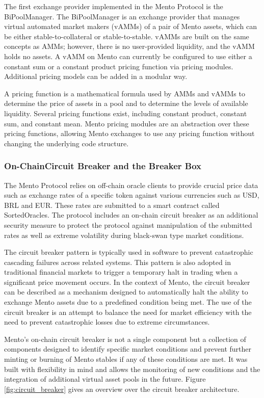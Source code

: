 \documentclass[a4paper]{article}
\theoremstyle{definition}
\begin{document}
The first exchange provider implemented in the Mento Protocol is the BiPoolManager. The BiPoolManager is an exchange provider that manages virtual automated market makers (vAMMs) of a pair of Mento assets, which can be either stable-to-collateral or stable-to-stable. vAMMs are built on the same concepts as AMMs; however, there is no user-provided liquidity, and the vAMM holds no assets. A vAMM on Mento can currently be configured to use either a constant sum or a constant product pricing function via pricing modules. Additional pricing models can be added in a modular way.  

A pricing function is a mathematical formula used by AMMs and vAMMs to determine the price of assets in a pool and to determine the levels of available liquidity. Several pricing functions exist, including constant product, constant sum, and constant mean. Mento pricing modules are an abstraction over these pricing functions, allowing Mento exchanges to use any pricing function without changing the underlying code structure.

\subsubsection{On-ChainCircuit Breaker and the Breaker Box}

The Mento Protocol relies on off-chain oracle clients to provide crucial price data such as exchange rates of a specific token against various currencies such as USD, BRL and EUR. These rates are submitted to a smart contract called SortedOracles. The protocol includes an on-chain circuit breaker as an additional security measure to protect the protocol against manipulation of the submitted rates as well as extreme volatility during black-swan type market conditions.

The circuit breaker pattern is typically used in software to prevent catastrophic cascading failures across related systems. This pattern is also adopted in traditional financial markets to trigger a temporary halt in trading when a significant price movement occurs. In the context of Mento, the circuit breaker can be described as a mechanism designed to automatically halt the ability to exchange Mento assets due to a predefined condition being met. The use of the circuit breaker is an attempt to balance the need for market efficiency with the need to prevent catastrophic losses due to extreme circumstances.

Mento's on-chain circuit breaker is not a single component but a collection of components designed to identify specific market conditions and prevent further minting or burning of Mento stables if any of these conditions are met. It was built with flexibility in mind and allows the monitoring of new conditions and the integration of additional virtual asset pools in the future. Figure \ref{fig:circuit_breaker} gives an overview over the circuit breaker architecture.
\end{document}
